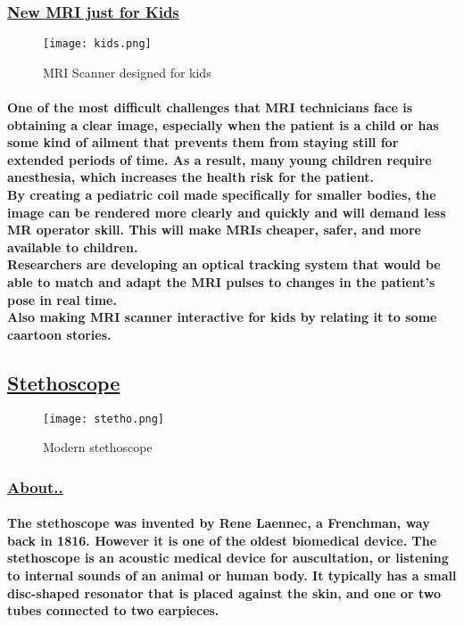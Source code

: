 \documentclass[12pt]{article}
\begin{document}
    \subsubsection{\underline{New MRI just for Kids}}
     \begin{figure}[h]
    	\texttt{[image: kids.png]}
    	\caption{MRI Scanner designed for kids}
    \end{figure}
    \paragraph{ One of the most difficult challenges that MRI technicians face is obtaining a clear image, especially when the patient is a child or has some kind of ailment that prevents them from staying still for extended periods of time. As a result, many young children require anesthesia, which increases the health risk for the patient.\\By creating a pediatric coil made specifically for smaller bodies, the image can be rendered more clearly and quickly and will demand less MR operator skill. This will make MRIs cheaper, safer, and more available to children. \\Researchers are developing an optical tracking system that would be able to match and adapt the MRI pulses to changes in the patient’s pose in real time. \\Also making MRI scanner interactive for kids by relating it to some caartoon stories.
    }
    \clearpage
    \subsection{\underline{Stethoscope}}
    \begin{figure}[h]
    	\texttt{[image: stetho.png]}
    	\caption{Modern stethoscope}
    \end{figure}
    \subsubsection{\underline{About..}}
    \paragraph{The stethoscope was invented by Rene Laennec, a Frenchman, way back in 1816. However it is one of the oldest biomedical device. The stethoscope is an acoustic medical device for auscultation, or listening to internal sounds of an animal or human body. It typically has a small disc-shaped resonator that is placed against the skin, and one or two tubes connected to two earpieces.
    }
\end{document}
